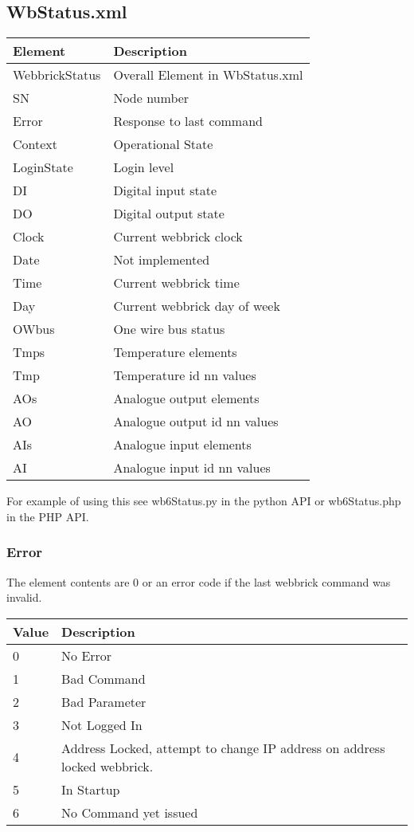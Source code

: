 \subsection {WbStatus.xml}

    \begin{tabular}{l|l}
    Element&Description\\
    \hline
    WebbrickStatus&Overall Element in WbStatus.xml\\
    SN&Node number\\
    Error&Response to last command\\
    Context&Operational State\\
    LoginState&Login level\\
    DI&Digital input state\\
    DO&Digital output state\\
    Clock&Current webbrick clock\\
    Date&Not implemented\\
    Time&Current webbrick time\\
    Day&Current webbrick day of week\\
    OWbus&One wire bus status\\
    Tmps&Temperature elements\\
    Tmp&Temperature id nn values\\
    AOs&Analogue output elements\\
    AO&Analogue output id nn values\\
    AIs&Analogue input elements\\
    AI&Analogue input id nn values\\
    \end{tabular}

For example of using this see wb6Status.py in the python API or wb6Status.php in the PHP API.

\subsubsection {Error}
The element contents are 0 or an error code if the last webbrick command was invalid.

    \begin{tabular}{l|l}
    Value&Description\\
    \hline
    0&No Error\\
	1&Bad Command\\
	2&Bad Parameter\\
	3&Not Logged In\\
	4&Address Locked, attempt to change IP address on address locked webbrick.\\
	5&In Startup\\
	6&No Command yet issued\\
    \end{tabular}


